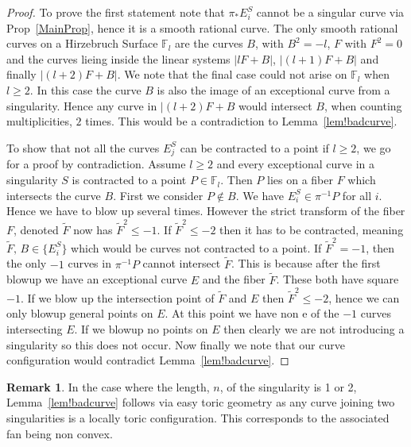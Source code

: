 \documentclass[11pt]{amsbook}
\theoremstyle{definition}
\theoremstyle{definition}
\theoremstyle{definition}
\theoremstyle{definition}
\theoremstyle{definition}
\theoremstyle{definition}
\theoremstyle{definition}
\theoremstyle{definition}
\newtheorem*{rem}{Remark}
\newcommand{\mb}[1]{\mathbb{#1}}
\newcommand{\wt}[1]{\widetilde #1}
\begin{document}
\begin{proof}
To prove the first statement note that $\pi_* E_i^S$ cannot be a singular curve via Prop~\ref{MainProp}, hence it is a smooth rational curve. The only smooth rational curves on a Hirzebruch Surface $\mb{F}_l$ are the curves $B$, with $B^2 = -l$, $F$ with $F^2 = 0$ and the curves lieing inside the linear systems $|lF + B|$, $|(l+1)F + B|$ and finally $|(l+2)F + B|$. We note that the final case could not arise on $\mb{F}_l$ when $l \ge 2$.  In this case the curve $B$ is also the image of an exceptional curve from a singularity. Hence any curve in $|(l+2)F + B$ would intersect $B$, when counting multiplicities, $2$ times. This would be a contradiction to Lemma~\ref{lem!badcurve}.



To show that not all the curves $E_j^S$ can be contracted to a point if $l \geq 2$, we go for a proof by contradiction. Assume $l \ge 2$ and every exceptional curve in a singularity $S$ is contracted to a point $P \in \mb{F}_l$. Then $P$ lies on a fiber $F$ which intersects the curve $B$. First we consider $P \not\in B$. We have $E_i^S \in \pi^{-1}{P}$ for all $i$. Hence we have to blow up several times. However the strict transform of the fiber $F$, denoted $\wt{F}$ now has $\wt{F}^2 \leq -1$. If $\wt{F}^2 \leq -2$ then it has to be contracted, meaning $\wt{F}, \, B \in \{ E_i^S \}$ which would be curves not contracted to a point. If $\wt{F}^2 = -1$, then the only $-1 $ curves in $\pi^{-1}{P}$ cannot intersect $\wt{F}$. This is because after the first blowup we have an exceptional curve $E$ and the fiber $\wt{F}$. These both have square $-1$. If we blow up the intersection point of $\wt{F}$ and $E$ then $\wt{F}^2 \leq -2$, hence we can only blowup general points on $E$. At this point we have non e of the $-1$ curves intersecting $E$. If we blowup no points on $E$ then clearly we are not introducing a singularity so this does not occur. Now finally we note that our curve configuration would contradict Lemma~\ref{lem!badcurve}. 

\end{proof}

\begin{rem}
In the case where the length, $n$, of the singularity is 1 or 2, Lemma~\ref{lem!badcurve} follows via easy toric geometry as any curve joining two singularities is a locally toric configuration. This corresponds to the associated fan being non convex. 
\end{rem}
\end{document}
